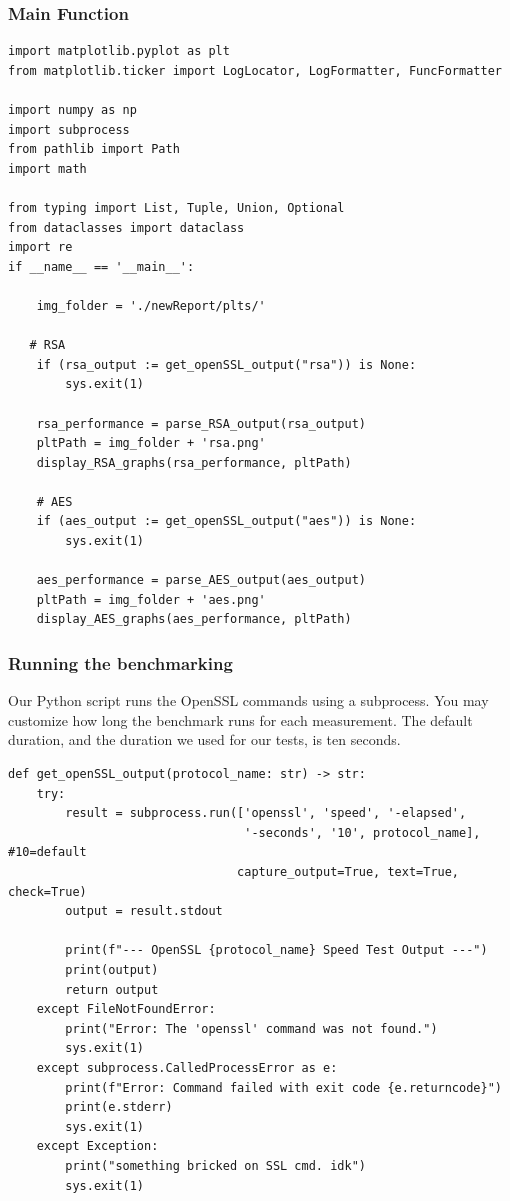 \documentclass[11pt]{article}
\begin{document}
\subsubsection*{Main Function}

\begin{framed}
\begin{verbatim}
import matplotlib.pyplot as plt
from matplotlib.ticker import LogLocator, LogFormatter, FuncFormatter

import numpy as np
import subprocess
from pathlib import Path
import math

from typing import List, Tuple, Union, Optional
from dataclasses import dataclass
import re
if __name__ == '__main__':
    
    img_folder = './newReport/plts/'

   # RSA
    if (rsa_output := get_openSSL_output("rsa")) is None:
        sys.exit(1)

    rsa_performance = parse_RSA_output(rsa_output)
    pltPath = img_folder + 'rsa.png'
    display_RSA_graphs(rsa_performance, pltPath)

    # AES
    if (aes_output := get_openSSL_output("aes")) is None:
        sys.exit(1)

    aes_performance = parse_AES_output(aes_output)
    pltPath = img_folder + 'aes.png'
    display_AES_graphs(aes_performance, pltPath) 
\end{verbatim}
\end{framed}

\subsubsection*{Running the benchmarking}
Our Python script runs the OpenSSL commands using a subprocess. You may customize how long the benchmark runs for each measurement. The default duration, and the duration we used for our tests, is ten seconds.
\begin{framed}
\begin{verbatim}
def get_openSSL_output(protocol_name: str) -> str:
    try:
        result = subprocess.run(['openssl', 'speed', '-elapsed',
                                 '-seconds', '10', protocol_name], #10=default
                                capture_output=True, text=True, check=True)
        output = result.stdout
        
        print(f"--- OpenSSL {protocol_name} Speed Test Output ---")
        print(output)
        return output
    except FileNotFoundError:
        print("Error: The 'openssl' command was not found.")
        sys.exit(1)
    except subprocess.CalledProcessError as e:
        print(f"Error: Command failed with exit code {e.returncode}")
        print(e.stderr)
        sys.exit(1)
    except Exception:
        print("something bricked on SSL cmd. idk")
        sys.exit(1)
\end{verbatim}
\end{framed}
\end{document}
